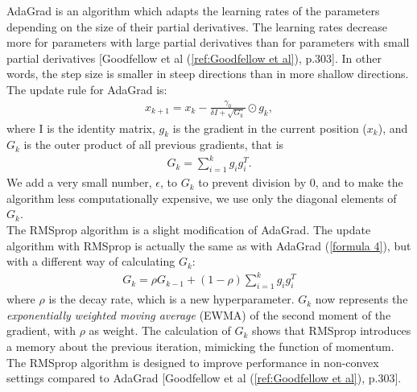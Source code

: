 \documentclass[english,notitlepage,reprint,nofootinbib]{revtex4-1}  %
\begin{document}
AdaGrad is an algorithm which adapts the learning rates of the parameters depending on the size of their partial derivatives. The learning rates decrease more for parameters with large partial derivatives than for parameters with small partial derivatives [Goodfellow et al (\ref{ref:Goodfellow et al}), p.303]. In other words, the step size is smaller in steep directions than in more shallow directions. The update rule for AdaGrad is:
\begin{align} \label{formula 4}
    x_{k+1} = x_{k} - \frac{\gamma_{0}}{\delta I + \sqrt{G_{k}}}\odot g_{k},
\end{align}
where I is the identity matrix, $g_{k}$ is the gradient in the current position ($x_{k}$), and $G_{k}$ is the outer product of all previous gradients, that is
\begin{align} 
    G_{k} = \sum_{i=1}^{k} g_{i}g_{i}^{T}.
\end{align}
We add a very small number, $\epsilon$, to $G_{k}$ to prevent division by 0, and to make the algorithm less computationally expensive, we use only the diagonal elements of $G_{k}$.
\\

The RMSprop algorithm is a slight modification of AdaGrad. The update algorithm with RMSprop is actually the same as with AdaGrad (\ref{formula 4}), but with a different way of calculating $G_{k}$:
\begin{align} \label{formula 6}
    G_{k} = \rho G_{k-1} + (1 - \rho) \sum_{i=1}^{k} g_{i}g_{i}^{T}
\end{align}
where $\rho$ is the decay rate, which is a new hyperparameter. $G_{k}$ now represents the \textit{exponentially weighted moving average} (EWMA) of the second moment of the gradient, with $\rho$ as weight. %
The calculation of $G_{k}$ shows that RMSprop introduces a memory about the previous iteration, mimicking the function of momentum. The RMSprop algorithm is designed to improve performance in non-convex settings compared to AdaGrad [Goodfellow et al (\ref{ref:Goodfellow et al}), p.303]. \\
\end{document}
